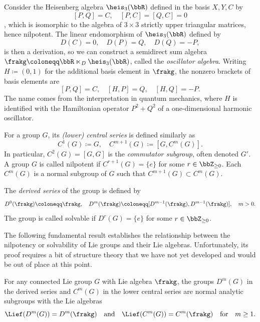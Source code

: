 \begin{example}
    Consider the Heisenberg algebra $\heis_3(\bbR)$ defined in the basis $X,Y,C$ by 
    \[[P,Q]=C,\quad [P,C]=[Q,C]=0\],
    which is isomorphic to the algebra of $3\times 3$ strictly upper triangular matrices, hence nilpotent. The linear endomorphism of $\heis_3(\bbR)$ defined by 
    \[D(C)=0,\quad D(P)=Q,\quad D(Q)=-P,\]
    is then a derivation, so we can construct a semidirect sum algebra $\frakg\coloneqq \bbR\ltimes_D\heis_3(\bbR)$, called the \emph{oscillator algebra}. Writing $H\coloneqq (0,1)$ for the additional basis element in $\frakg$, the nonzero brackets of basis elements are 
    \[[P,Q]=C,\quad [H,P]=Q,\quad [H,Q]=-P.\]
    The name comes from the interpretation in quantum mechanics, where $H$ is identified with the Hamiltonian operator $P^2+Q^2$ of a one-dimensional harmonic oscillator.
\end{example}

\begin{defn}
    For a group $G$, its \emph{(lower) central series} is defined similarly as 
    \[C^1(G)\coloneqq G,\quad C^{m+1}(G)\coloneqq [G,C^m(G)].\]
    In particular, $C^2(G)=[G,G]$ is the \emph{commutator subgroup}, often denoted $G'$. A group $G$ is called nilpotent if $C^{r+1}(G)=\{e\}$ for some $r\in\bbZ_{\geq 0}$. Each $C^m(G)$ is a normal subgroup of $G$ such that $C^{m+1}(G)\subset C^m(G)$.

    The \emph{derived series} of the group is defined by 
    \[D^0(\frakg)\coloneqq \frakg,\quad D^m(\frakg)\coloneqq [D^{m-1}(\frakg),D^{m-1}(\frakg)],\quad m>0.\]
    The group is called solvable if $D^r(G)=\{e\}$ for some $r\in\bbZ_{\geq 0}$.
\end{defn}

The following fundamental result establishes the relationship between the nilpotency or solvability of Lie groups and their Lie algebras. Unfortunately, its proof requires a bit of structure theory that we have not yet developed and would be out of place at this point.

\begin{prop}[{\cite[Prop.~11.2.4]{HN}}]
    For any connected Lie group $G$ with Lie algebra $\frakg$, the groups $D^m(G)$ in the derived series and $C^m(G)$ in the lower central series are normal analytic subgroups with the Lie algebras 
    \[\Lief(D^m(G))=D^m(\frakg)\quad \text{and}\quad \Lief(C^m(G))=C^m(\frakg)\quad \text{for}\quad m\geq 1.\]
\end{prop}

